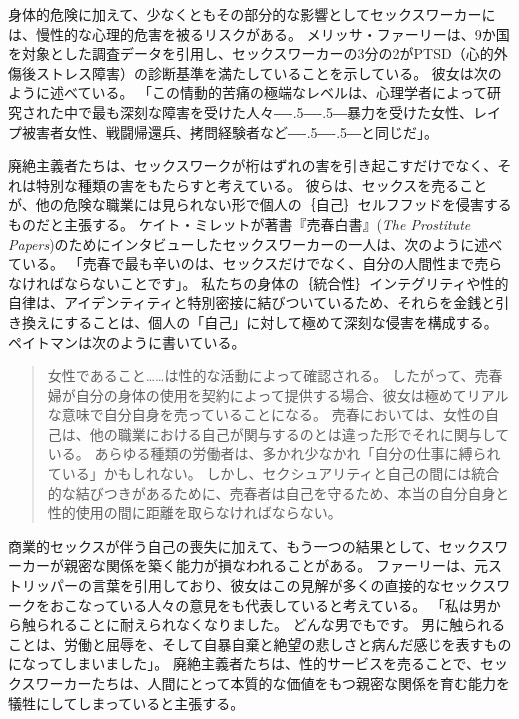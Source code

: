\documentclass[paper=a4,book,openany]{jlreq}
\def\DDASH{―\kern-.5\zw―\kern-.5\zw―} %
\begin{document}
身体的危険に加えて、少なくともその部分的な影響としてセックスワーカーには、慢性的な心理的危害を被るリスクがある。
メリッサ・ファーリーは、9か国を対象とした調査データを引用し、セックスワーカーの3分の2がPTSD（心的外傷後ストレス障害）の診断基準を満たしていることを示している。
彼女は次のように述べている。
「この情動的苦痛の極端なレベルは、心理学者によって研究された中で最も深刻な障害を受けた人々{\DDASH}暴力を受けた女性、レイプ被害者女性、戦闘帰還兵、拷問経験者など{\DDASH}と同じだ」\citep[p.100]{farley18:_risks_prost}。

廃絶主義者たちは、セックスワークが桁はずれの害を引き起こすだけでなく、それは特別な種類の害をもたらすと考えている。
彼らは、セックスを売ることが、他の危険な職業には見られない形で個人の｛自己｝{セルフフッド}を侵害するものだと主張する。
ケイト・ミレットが著書『売春白書』(\emph{The Prostitute Papers})のためにインタビューしたセックスワーカーの一人は、次のように述べている。
「売春で最も辛いのは、セックスだけでなく、自分の人間性まで売らなければならないことです」\citep[p.84]{millett76:_prost_paper}。
私たちの身体の｛統合性｝{インテグリティ}や性的自律は、アイデンティティと特別密接に結びついているため、それらを金銭と引き換えにすることは、個人の「自己」に対して極めて深刻な侵害を構成する。
ペイトマンは次のように書いている。

\begin{quote}
女性であること……は性的な活動によって確認される。
したがって、売春婦が自分の身体の使用を契約によって提供する場合、彼女は極めてリアルな意味で自分自身を売っていることになる。
売春においては、女性の自己は、他の職業における自己が関与するのとは違った形でそれに関与している。
あらゆる種類の労働者は、多かれ少なかれ「自分の仕事に縛られている」かもしれない。
しかし、セクシュアリティと自己の間には統合的な結びつきがあるために、売春者は自己を守るため、本当の自分自身と性的使用の間に距離を取らなければならない。
\citep{pateman88:_sexual_contr}
\end{quote}

商業的セックスが伴う自己の喪失に加えて、もう一つの結果として、セックスワーカーが親密な関係を築く能力が損なわれることがある。
ファーリーは、元ストリッパーの言葉を引用しており、彼女はこの見解が多くの直接的なセックスワークをおこなっている人々の意見をも代表していると考えている。
「私は男から触られることに耐えられなくなりました。
どんな男でもです。
男に触られることは、労働と屈辱を、そして自暴自棄と絶望の悲しさと病んだ感じを表すものになってしまいました」\citep{farley13:_prost_liber_slaver}。
廃絶主義者たちは、性的サービスを売ることで、セックスワーカーたちは、人間にとって本質的な価値をもつ親密な関係を育む能力を犠牲にしてしまっていると主張する。
\end{document}
